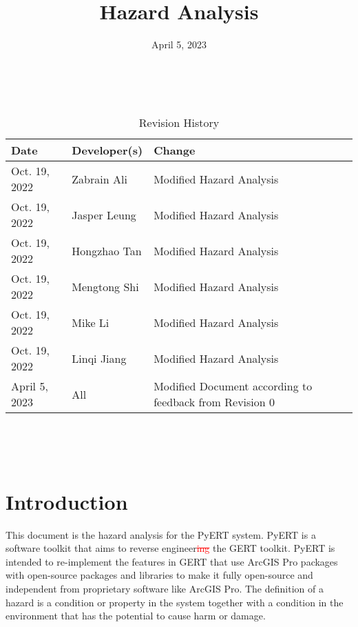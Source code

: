 \documentclass{article}
\title{Hazard Analysis\\\progname}
\author{\authname}
\date{April 5, 2023}
\begin{document}
\maketitle
\thispagestyle{empty}

~\newpage


\begin{table}[hp]
\caption{Revision History} \label{TblRevisionHistory}
\begin{tabularx}{\textwidth}{llX}
\toprule
\textbf{Date} & \textbf{Developer(s)} & \textbf{Change}\\
\midrule
Oct. 19, 2022 & Zabrain Ali & Modified Hazard Analysis\\
Oct. 19, 2022 & Jasper Leung & Modified Hazard Analysis\\
Oct. 19, 2022 & Hongzhao Tan & Modified Hazard Analysis\\
Oct. 19, 2022 & Mengtong Shi & Modified Hazard Analysis\\
Oct. 19, 2022 & Mike Li & Modified Hazard Analysis\\
Oct. 19, 2022 & Linqi Jiang & Modified Hazard Analysis\\
April 5, 2023 & All & Modified Document according to feedback from Revision 0\\
\bottomrule
\end{tabularx}
\end{table}

~\newpage

\tableofcontents

~\newpage
\thispagestyle{empty}
\listoftables
\newpage



\section{Introduction}

This document is the hazard analysis for the PyERT system. PyERT is a software toolkit that aims to reverse engineer\textcolor{red}{\sout{ing}} the GERT toolkit. PyERT is intended to re-implement the features in GERT that use ArcGIS Pro packages with open-source packages and libraries to make it fully open-source and independent from proprietary software like ArcGIS Pro. The definition of a hazard is a condition or property in the system together with a condition in the environment that has the potential to cause harm or damage.
\end{document}
